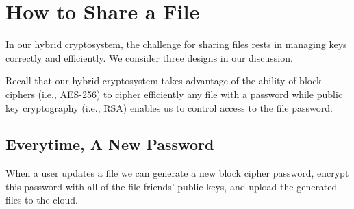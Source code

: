 \section{How to Share a File}

In our hybrid cryptosystem, the challenge for sharing files rests in
managing keys correctly and efficiently. We consider three designs in
our discussion.

Recall that our hybrid cryptosystem takes advantage of the ability of
block ciphers (i.e., AES-256) to cipher efficiently any file with a
password while public key cryptography (i.e., RSA) enables us to
control access to the file password.

\subsection{Everytime, A New Password}

When a user updates a file we can generate a new block cipher
password, encrypt this password with all of the file friends' public
keys, and upload the generated files to the cloud.



